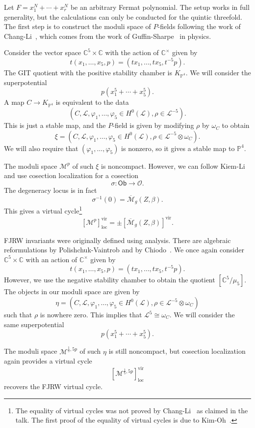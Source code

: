 \documentclass[10pt]{amsart}
\theoremstyle{definition}
\theoremstyle{remark}
\theoremstyle{plain}
\theoremstyle{definition}
\theoremstyle{remark}
\newcommand{\C}{\mathbb{C}}
\renewcommand{\P}{\mathbb{P}}
\newcommand{\M}{\mathcal{M}}
\newcommand{\Mbar}{\overline{\mathcal{M}}}
\newcommand{\mc}[1]{\mathcal{#1}}
\newcommand{\mr}[1]{\mathrm{#1}}
\newcommand{\on}[1]{\operatorname{#1}}
\newcommand{\ms}[1]{\mathsf{#1}}
\newcommand{\1}{\mathbf{1}}
\newcommand{\2}{\mathbf{2}}
\newcommand{\3}{\mathbf{3}}
\newcommand{\vir}{\mr{vir}}
\begin{document}
Let $F = x_1^N + \cdots + x_r^N$ be an arbitrary Fermat polynomial. The setup works in full generality, but the calculations can only be conducted for the quintic threefold. The first step is to construct the moduli space of $P$-fields following the work of Chang-Li~\cite{pfieldschangli}, which comes from the work of Guffin-Sharpe~\cite{guffin} in physics.

Consider the vector space $\C^5 \times \C$ with the action of $\C^{\times}$ given by
\[ t(x_1, \ldots, x_5, p) = (t x_1, \ldots, t x_5, t^{-5}p). \]
The GIT quotient with the positive stability chamber is $K_{\P^4}$. We will consider the superpotential
\[ p (x_1^5 + \cdots + x_5^5). \]
A map $C \to K_{\P^4}$ is equivalent to the data
\[ (C, \mc{L}, \varphi_1, \ldots, \varphi_5 \in H^0(\mc{L}), \rho \in \mc{L}^{-5}). \]
This is just a stable map, and the $P$-field is given by modifying $\rho$ by $\omega_C$ to obtain
\[ \xi = (C, \mc{L}, \varphi_1, \ldots, \varphi_5 \in H^0(\mc{L}), \rho \in \mc{L}^{-5}\otimes \omega_C). \]
We will also require that $(\varphi_1, \ldots, \varphi_5)$ is nonzero, so it gives a stable map to $\P^4$.

The moduli space $\M^p$ of such $\xi$ is noncompact. However, we can follow Kiem-Li~\cite{cosection} and use cosection localization for a cosection
\[ \sigma \colon \ms{Ob} \to \mc{O}. \]
The degeneracy locus is in fact
\[ \sigma^{-1}(0) = \Mbar_g(Z,\beta). \]
This gives a virtual cycle\footnote{The equality of virtual cycles was not proved by Chang-Li~\cite{pfieldschangli} as claimed in the talk. The first proof of the equality of virtual cycles is due to Kim-Oh~\cite{localizedchern}.}
\[ [\M^p]^{\vir}_{\mr{loc}} = \pm [\Mbar_g(Z,\beta)]^{\vir}. \]


FJRW invariants were originally defined using analysis. There are algebraic reformulations by Polishchuk-Vaintrob and by Chiodo~\cite{mfcohftFJRW,wittenkthy}. We once again consider $\C^5 \times \C$ with an action of $\C^{\times}$ given by
\[ t(x_1, \ldots, x_5, p) = (t x_1, \ldots, t x_5, t^{-5}p). \]
However, we use the negative stability chamber to obtain the quotient $[\C^5/\mu_5]$. The objects in our moduli space are given by
\[ \eta = (C, \mc{L}, \varphi_1, \ldots, \varphi_5 \in H^0(\mc{L}), \rho \in \mc{L}^{-5}\otimes \omega_C) \]
such that $\rho$ is nowhere zero. This implies that $\mc{L}^5 \cong \omega_C$. We will consider the same superpotential
\[ p(x_1^5 + \cdots + x_5^5). \]

The moduli space $\M^{\frac{1}{5},5p}$ of such $\eta$ is still noncompact, but cosection localization again provides a virtual cycle
\[ [\M^{\frac{1}{5},5p}]^{\vir}_{\on{loc}} \]
recovers the FJRW virtual cycle.
\end{document}
